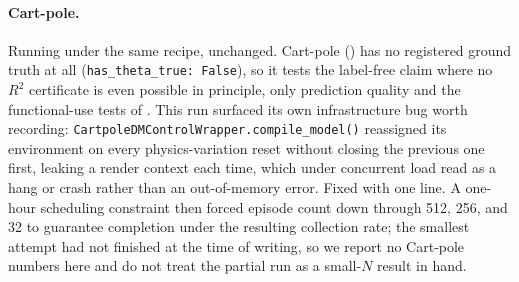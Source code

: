 \paragraph{Cart-pole.} Running under the same recipe, unchanged.
Cart-pole () has no registered ground truth
at all (\texttt{has\_theta\_true: False}), so it tests the label-free
claim where no $R^2$ certificate is even possible in principle, only
prediction quality and the functional-use tests of
. This run surfaced its own infrastructure bug
worth recording: \texttt{CartpoleDMControlWrapper.compile\_model()}
reassigned its environment on every physics-variation reset without
closing the previous one first, leaking a render context each time,
which under concurrent load read as a hang or crash rather than an
out-of-memory error. Fixed with one line. A one-hour scheduling
constraint then forced episode count down through 512, 256, and 32 to
guarantee completion under the resulting collection rate; the smallest
attempt had not finished at the time of writing, so we report no
Cart-pole numbers here and do not treat the partial run as a small-$N$
result in hand.
